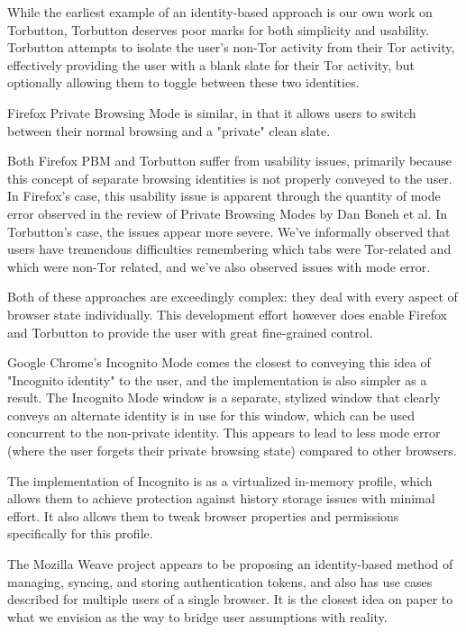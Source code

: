 \documentclass[letterpaper,11pt]{llncs}
\begin{document}
While the earliest example of an identity-based approach is our own work on
Torbutton\cite{torbutton}, Torbutton deserves poor marks for both simplicity
and usability\cite{not-to-toggle}. Torbutton attempts to isolate the user's
non-Tor activity from their Tor activity, effectively providing the user with
a blank slate for their Tor activity, but optionally allowing them to toggle
between these two identities.

Firefox Private Browsing Mode is similar, in that it allows users to switch
between their normal browsing and a "private" clean slate.

Both Firefox PBM and Torbutton suffer from usability issues, primarily because
this concept of separate browsing identities is not properly conveyed to the
user. In Firefox's case, this usability issue is apparent through the quantity
of mode error observed in the review of Private Browsing Modes by Dan Boneh et
al\cite{private-browsing}. In Torbutton's case, the issues appear more severe.
We've informally observed that users have tremendous difficulties remembering
which tabs were Tor-related and which were non-Tor related, and we've also
observed issues with mode error.

Both of these approaches are exceedingly complex: they deal with every aspect
of browser state individually. This development effort however does enable
Firefox and Torbutton to provide the user with great fine-grained control.

Google Chrome's Incognito Mode comes the closest to conveying this idea of
"Incognito identity" to the user, and the implementation is also simpler as a
result. The Incognito Mode window is a separate, stylized window that clearly
conveys an alternate identity is in use for this window, which can be used
concurrent to the non-private identity. This appears to lead to less mode
error (where the user forgets their private browsing state) compared to other
browsers.

The implementation of Incognito is as a virtualized in-memory profile, which
allows them to achieve protection against history storage issues with minimal
effort. It also allows them to tweak browser properties and permissions
specifically for this profile.

The Mozilla Weave project appears to be proposing an identity-based method of
managing, syncing, and storing authentication tokens, and also has use cases
described for multiple users of a single browser\cite{weave-manager}. It is
the closest idea on paper to what we envision as the way to bridge user
assumptions with reality.
\end{document}
